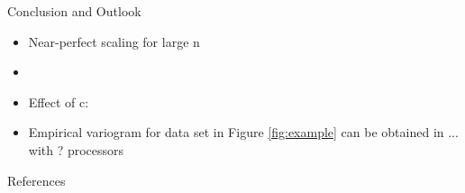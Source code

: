 \documentclass[serif,mathserif,final]{beamer}
\begin{document}
\begin{frame}{}
\begin{columns}[t]
\begin{column}{0.32\linewidth}
      \begin{block}{Conclusion and Outlook}
        \begin{itemize}
         \item Near-perfect scaling for large n
         \item 
         \item Effect of c:
         \item Empirical variogram for data set in Figure \ref{fig:example} can be obtained in ... with ? processors
        \end{itemize}
      \end{block}

      \begin{block}{References}
        
	{\footnotesize
	}
      \end{block}

    \end{column}%

  \end{columns}
\end{frame}
\end{document}
